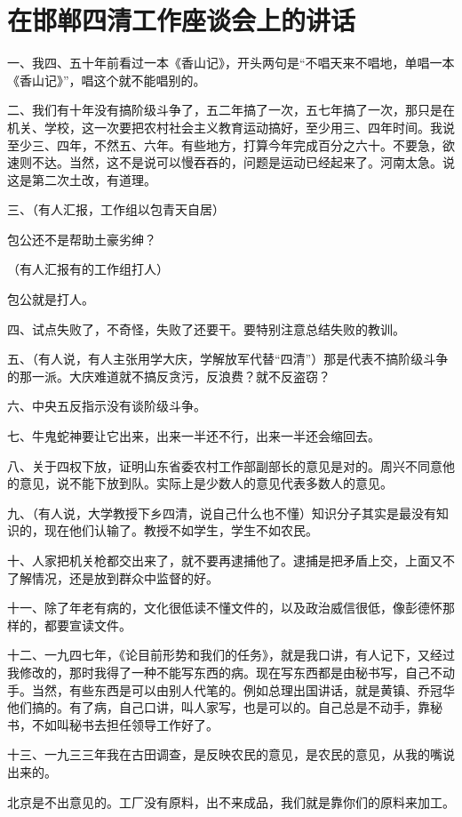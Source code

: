 \section[在邯郸四清工作座谈会上的讲话（一九六四年三月二十八日）]{在邯郸四清工作座谈会上的讲话}


一、我四、五十年前看过一本《香山记》，开头两句是“不唱天来不唱地，单唱一本《香山记》”，唱这个就不能唱别的。

二、我们有十年没有搞阶级斗争了，五二年搞了一次，五七年搞了一次，那只是在机关、学校，这一次要把农村社会主义教育运动搞好，至少用三、四年时间。我说至少三、四年，不然五、六年。有些地方，打算今年完成百分之六十。不要急，欲速则不达。当然，这不是说可以慢吞吞的，问题是运动已经起来了。河南太急。说这是第二次土改，有道理。

三、（有人汇报，工作组以包青天自居）

包公还不是帮助土豪劣绅？

（有人汇报有的工作组打人）

包公就是打人。

四、试点失败了，不奇怪，失败了还要干。要特别注意总结失败的教训。

五、（有人说，有人主张用学大庆，学解放军代替“四清”）那是代表不搞阶级斗争的那一派。大庆难道就不搞反贪污，反浪费？就不反盗窃？

六、中央五反指示没有谈阶级斗争。

七、牛鬼蛇神要让它出来，出来一半还不行，出来一半还会缩回去。

八、关于四权下放，证明山东省委农村工作部副部长的意见是对的。周兴不同意他的意见，说不能下放到队。实际上是少数人的意见代表多数人的意见。

九、（有人说，大学教授下乡四清，说自己什么也不懂）知识分子其实是最没有知识的，现在他们认输了。教授不如学生，学生不如农民。

十、人家把机关枪都交出来了，就不要再逮捕他了。逮捕是把矛盾上交，上面又不了解情况，还是放到群众中监督的好。

十一、除了年老有病的，文化很低读不懂文件的，以及政治威信很低，像彭德怀那样的，都要宣读文件。

十二、一九四七年，《论目前形势和我们的任务》，就是我口讲，有人记下，又经过我修改的，那时我得了一种不能写东西的病。现在写东西都是由秘书写，自己不动手。当然，有些东西是可以由别人代笔的。例如总理出国讲话，就是黄镇、乔冠华他们搞的。有了病，自己口讲，叫人家写，也是可以的。自己总是不动手，靠秘书，不如叫秘书去担任领导工作好了。

十三、一九三三年我在古田调查，是反映农民的意见，是农民的意见，从我的嘴说出来的。

北京是不出意见的。工厂没有原料，出不来成品，我们就是靠你们的原料来加工。
